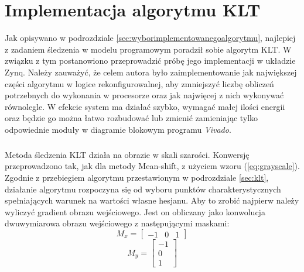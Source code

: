 \chapter{Implementacja algorytmu KLT}
\label{cha:implementacjaalgorytmuklt}


Jak opisywano w podrozdziale \ref{sec:wyborimplementowanegoalgorytmu}, najlepiej z zadaniem śledzenia w modelu programowym poradził sobie algorytm KLT.
W związku z tym postanowiono przeprowadzić próbę jego implementacji w układzie Zynq. %
Należy zauważyć, że celem autora było zaimplementowanie jak największej części algorytmu w logice rekonfigurowalnej, aby zmniejszyć liczbę obliczeń potrzebnych do wykonania w procesorze oraz jak najwięcej z nich wykonywać równolegle. 
W efekcie system ma działać szybko, wymagać małej ilości energii oraz będzie go można łatwo rozbudować lub zmienić zamieniając tylko odpowiednie moduły w diagramie blokowym programu \textit{Vivado}.

\paragraph*{}
Metoda śledzenia KLT działa na obrazie w skali szarości.
Konwersję przeprowadzono tak, jak dla metody Mean-shift, z użyciem wzoru (\ref{eq:grayscale}). 
Zgodnie z przebiegiem algorytmu przestawionym w podrozdziale \ref{sec:klt}, działanie algorytmu rozpoczyna się od wyboru punktów charakterystycznych spełniających warunek na wartości własne hesjanu. 
Aby to zrobić najpierw należy wyliczyć gradient obrazu wejściowego. Jest on obliczany jako konwolucja dwuwymiarowa obrazu wejściowego z następującymi maskami:
\begin{equation}
M_x=
	\begin{bmatrix}
	-1 & 0 & 1
	\end{bmatrix}
\end{equation}
\begin{equation}
M_y=
	\begin{bmatrix}
	-1 \\
	0 \\
	1
	\end{bmatrix}
\end{equation}

